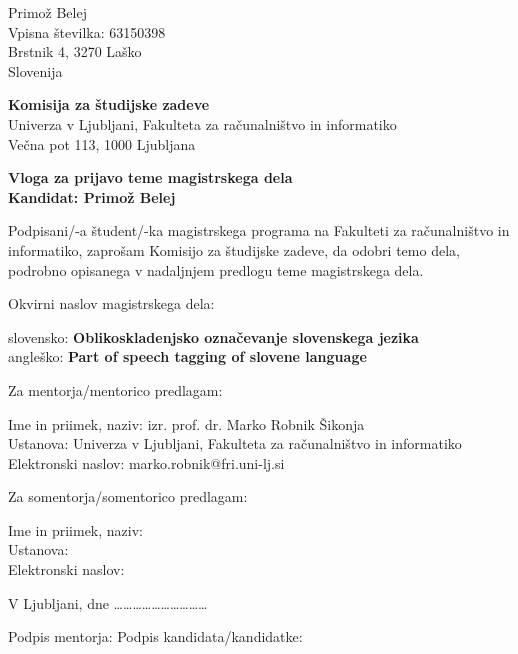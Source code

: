 \documentclass[a4paper, 12pt]{article}
\begin{document}
\noindent
Primož Belej\\
Vpisna številka: 63150398\\
Brstnik 4, 3270 Laško\\
Slovenija


\bigskip

{\bf Komisija za študijske zadeve}\\
Univerza v Ljubljani, Fakulteta za računalništvo in informatiko\\
Večna pot 113, 1000 Ljubljana

{\Large\bf
{\centering
    Vloga za prijavo teme magistrskega dela \\%
\large Kandidat: Primož Belej \\[10mm]}}


Podpisani/-a študent/-ka magistrskega programa na Fakulteti za računalništvo in informatiko, zaprošam Komisijo za študijske zadeve, da odobri temo dela, podrobno opisanega v nadaljnjem predlogu teme magistrskega dela.

Okvirni naslov magistrskega dela:

\hfill\begin{minipage}{\dimexpr\textwidth-2cm}
slovensko: {\bf Oblikoskladenjsko označevanje slovenskega jezika}\\
angleško: {\bf Part of speech tagging of slovene language}
\end{minipage}

Za mentorja/mentorico predlagam:

\hfill\begin{minipage}{\dimexpr\textwidth-2cm}
Ime in priimek, naziv: izr. prof. dr. Marko Robnik Šikonja\\
Ustanova: Univerza v Ljubljani, Fakulteta za računalništvo in informatiko\\
Elektronski naslov: marko.robnik@fri.uni-lj.si
\end{minipage}

Za somentorja/somentorico predlagam:

\hfill\begin{minipage}{\dimexpr\textwidth-2cm}
Ime in priimek, naziv:\\
Ustanova:\\
Elektronski naslov:
\end{minipage}


\bigskip

V Ljubljani, dne …………………………

Podpis mentorja: \hspace{180px} Podpis kandidata/kandidatke:
\end{document}
